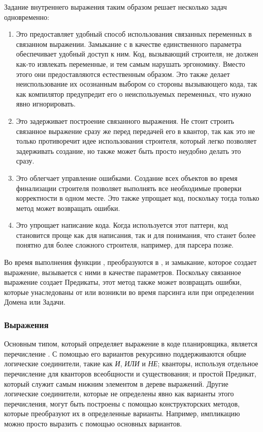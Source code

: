 Задание внутреннего выражения таким образом решает несколько задач одновременно:
\begin{enumerate}
  \item Это предоставляет удобный способ использования связанных переменных в связанном выражении.
    Замыкание с  в качестве единственного параметра
    обеспечивает удобный доступ к ним. Код, вызывающий строителя, не должен
    как-то извлекать переменные, и тем самым нарушать эргономику.
    Вместо этого они предоставляются естественным образом.
    Это также делает неиспользование их осознанным выбором со стороны вызывающего кода,
    так как компилятор предупредит его о неиспользуемых переменных, что нужно явно игнорировать.
  \item Это задерживает построение связанного выражения.
    Не стоит строить связанное выражение сразу же
    перед передачей его в квантор, так как это не только противоречит идее использования строителя,
    который легко позволяет задерживать создание, но также может быть просто неудобно делать это сразу.
  \item Это облегчает управление ошибками.
    Создание всех объектов во время финализации строителя
    позволяет выполнять все необходимые проверки корректности в одном месте.
    Это также упрощает код, поскольку тогда только метод  может возвращать ошибки.
  \item Это упрощает написание кода.
    Когда используется этот паттерн, код становится проще как для написания, так и для понимания,
    что станет более понятно для более сложного строителя, например, для парсера позже.
\end{enumerate}

Во время выполнения функции ,
 преобразуются в ,
и замыкание, которое создает выражение, вызывается с ними в качестве параметров.
Поскольку связанное выражение создает Предикаты,
этот метод также может возвращать ошибки,
которые унаследованы от  или возникли во время
парсинга или при определении Домена или Задачи.

\subsubsection{Выражения}

Основным типом, который определяет выражение в коде планировщика,
является перечисление .
С помощью его вариантов рекурсивно поддерживаются общие логические соединители,
такие как \textit{И}, \textit{ИЛИ} и \textit{НЕ};
кванторы, используя отдельное перечисление
для кванторов всеобщности и существования;
и простой Предикат, который служит самым нижним элементом в дереве выражений.
Другие логические соединители, которые не определены явно
как варианты этого перечисления, могут быть построены с помощью
конструкторских методов, которые преобразуют их в определенные варианты.
Например, импликацию можно просто выразить с помощью основных вариантов.

